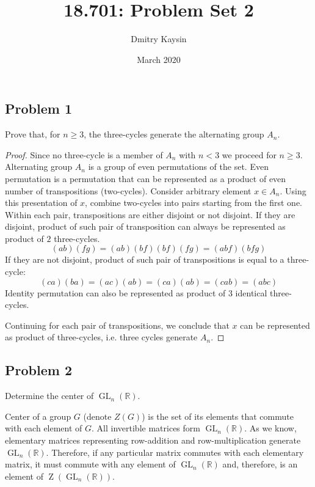 \documentclass{article}
\title{18.701: Problem Set 2}
\author{Dmitry Kaysin}
\date{March 2020}
\theoremstyle{definition}
\newcommand{\R}{\mathbb{R}}
\newcommand{\GL}[2]{\operatorname{GL}_{#1}(#2)}
\newcommand{\GLnR}{\GL{n}{\R}}
\begin{document}
\maketitle 


\subsection*{Problem 1}

\begin{tcolorbox}
Prove that, for $n \geq 3$, the three-cycles generate the alternating group $A_n$.
\end{tcolorbox}
\begin{proof}

Since no three-cycle is a member of $A_n$ with $n < 3$ we proceed for $n \geq 3$.
Alternating group $A_n$ is a group of even permutations of the set. Even permutation is a permutation that can be represented as a product of even number of transpositions (two-cycles). 
Consider arbitrary element $x \in A_n$. Using this presentation of $x$, combine two-cycles into pairs starting from the first one. Within each pair, transpositions are either disjoint or not disjoint.
If they are disjoint, product of such pair of transposition can always be represented as product of $2$ three-cycles.
\[ (ab)(fg) = (ab)(bf)(bf)(fg) = (abf)(bfg) \]
If they are not disjoint, product of such pair of transpositions is equal to a three-cycle:
\[ (ca)(ba) = (ac)(ab) = (ca)(ab) = (cab) = (abc) \]
Identity permutation can also be represented as product of $3$ identical three-cycles.

Continuing for each pair of transpositions, we conclude that $x$ can be represented as product of three-cycles, i.e. three cycles generate $A_n$.

\end{proof}


\subsection*{Problem 2}

\begin{tcolorbox}
Determine the center of $\GLnR$.
\end{tcolorbox}

Center of a group $G$ (denote $Z(G)$) is the set of its elements that commute with each element of $G$.
All invertible matrices form $\GLnR$.
As we know, elementary matrices representing row-addition and row-multiplication generate $\GLnR$.
Therefore, if any particular matrix commutes with each elementary matrix, it must commute with any element of $\GLnR$ and, therefore, is an element of $\operatorname{Z}(\GLnR)$.
\end{document}
